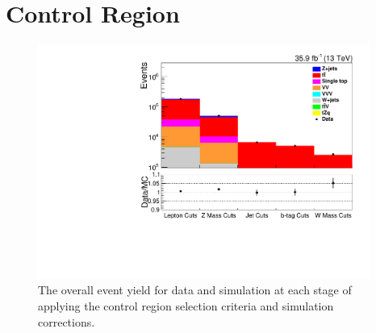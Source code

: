 \clearpage
\newpage

\section{\ttbar Control Region}\label{appSec:ttbarControlRegionPlots}

\begin{figure}[ht]
\centering
\includegraphics[width=0.97\textwidth]{figs/background-estimation/plots/unblinded/ttbar_control/cutFlow_log.pdf}
\caption{
The overall event yield for data and simulation at each stage of applying the \ttbar control region selection criteria and simulation corrections.
}
\label{fig:App_ttbar_cutFlow}
\end{figure}

